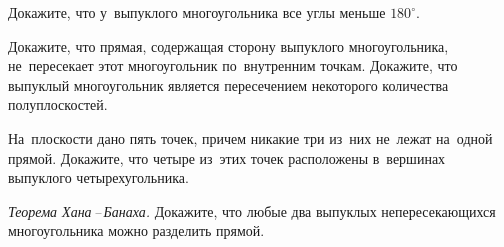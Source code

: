 \begin{problems}

\item
Докажите, что у~выпуклого многоугольника все углы меньше $180^\circ$.

\item
Докажите, что прямая, содержащая сторону выпуклого многоугольника,
не~пересекает этот многоугольник по~внутренним точкам.
Докажите, что выпуклый многоугольник является пересечением некоторого
количества полуплоскостей.

\item
На~плоскости дано пять точек, причем никакие три из~них не~лежат на~одной
прямой.
Докажите, что четыре из~этих точек расположены в~вершинах выпуклого
четырехугольника.

\item\emph{Теорема Хана\,--\,Банаха.}
Докажите, что любые два выпуклых непересекающихся многоугольника можно
разделить прямой.

\end{problems}

